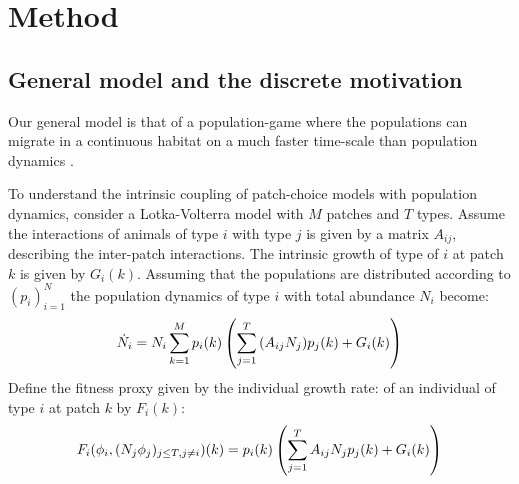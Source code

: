 \section{Method}


\subsection{General model and the discrete motivation}
\label{sec:gen_model}
Our general model is that of a population-game \citep{kvrivan2009evolutionary} where the populations can migrate in a continuous habitat on a much faster time-scale than population dynamics \citep{cressman2006migration, abrams2007role}.

To understand the intrinsic coupling of patch-choice models with population dynamics,
consider a Lotka-Volterra model with $M$ patches and $T$ types. Assume the interactions of animals of type $i$ with type $j$ is given by a matrix $A_{ij}$, describing the inter-patch interactions. The intrinsic growth of type of $i$ at patch $k$ is given by $G_{i}(k)$. Assuming that the populations are distributed according to $(p_i)_{i=1}^N$ the population dynamics of type $i$ with total abundance $N_i$ become:
  \begin{equation}
  \dot{N}_i = N_i \sum_{k=1}^M p_i(k) \pa{\sum_{j=1}^T {(A_{ij}N_j) p_j}(k) + G_i(k)} %
  \label{eq:pop_dyn_lv}
\end{equation}
Define the fitness proxy given by the individual growth rate:
of an individual of type $i$ at patch $k$ by $F_i(k)$:
\begin{equation}
  F_i(\phi_i, (N_j \phi_j)_{j \leq T, j \neq i})(k) = p_i(k) \pa{\sum_{j=1}^T {A_{ij}N_j p_j}(k) + G_{i}(k)} %
  \label{eq:utility_pm}
\end{equation}
